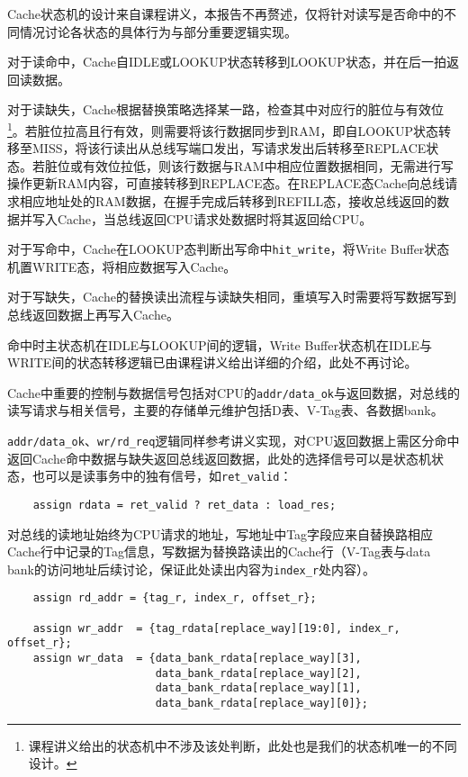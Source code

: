 \documentclass[UTF-8,twoside,c5size]{ctexart}
\begin{document}
    Cache状态机的设计来自课程讲义，本报告不再赘述，仅将针对读写是否命中的不同情况讨论各状态的具体行为与部分重要逻辑实现。
    
    对于读命中，Cache自IDLE或LOOKUP状态转移到LOOKUP状态，并在后一拍返回读数据。
    
    对于读缺失，Cache根据替换策略选择某一路，检查其中对应行的脏位与有效位\footnote{课程讲义给出的状态机中不涉及该处判断，此处也是我们的状态机唯一的不同设计。}。若脏位拉高且行有效，则需要将该行数据同步到RAM，即自LOOKUP状态转移至MISS，将该行读出从总线写端口发出，写请求发出后转移至REPLACE状态。若脏位或有效位拉低，则该行数据与RAM中相应位置数据相同，无需进行写操作更新RAM内容，可直接转移到REPLACE态。在REPLACE态Cache向总线请求相应地址处的RAM数据，在握手完成后转移到REFILL态，接收总线返回的数据并写入Cache，当总线返回CPU请求处数据时将其返回给CPU。
    
    对于写命中，Cache在LOOKUP态判断出写命中\texttt{hit\_write}，将Write Buffer状态机置WRITE态，将相应数据写入Cache。
    
    对于写缺失，Cache的替换读出流程与读缺失相同，重填写入时需要将写数据写到总线返回数据上再写入Cache。
    
    命中时主状态机在IDLE与LOOKUP间的逻辑，Write Buffer状态机在IDLE与WRITE间的状态转移逻辑已由课程讲义给出详细的介绍，此处不再讨论。
    
    Cache中重要的控制与数据信号包括对CPU的\texttt{addr/data\_ok}与返回数据，对总线的读写请求与相关信号，主要的存储单元维护包括D表、V-Tag表、各数据bank。
    
    \texttt{addr/data\_ok}、\texttt{wr/rd\_req}逻辑同样参考讲义实现，对CPU返回数据上需区分命中返回Cache命中数据与缺失返回总线返回数据，此处的选择信号可以是状态机状态，也可以是读事务中的独有信号，如\texttt{ret\_valid}：
    \begin{verbatim}
    assign rdata = ret_valid ? ret_data : load_res;
    \end{verbatim}
    
    对总线的读地址始终为CPU请求的地址，写地址中Tag字段应来自替换路相应Cache行中记录的Tag信息，写数据为替换路读出的Cache行（V-Tag表与data bank的访问地址后续讨论，保证此处读出内容为\texttt{index\_r}处内容）。
    \begin{verbatim}
    assign rd_addr = {tag_r, index_r, offset_r};
    
    assign wr_addr  = {tag_rdata[replace_way][19:0], index_r, offset_r};
    assign wr_data  = {data_bank_rdata[replace_way][3],
                       data_bank_rdata[replace_way][2],
                       data_bank_rdata[replace_way][1],
                       data_bank_rdata[replace_way][0]};
    \end{verbatim}
    
\end{document}
